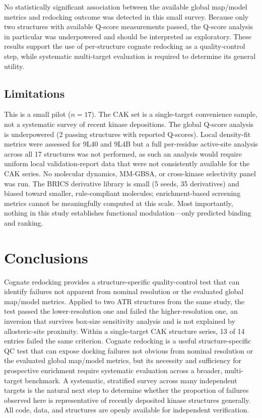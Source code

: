 \documentclass[global,twocolumn]{svjour}
\begin{document}
No statistically significant association between the available global
map/model metrics and redocking outcome was detected in this small survey.
Because only two structures with available Q-score measurements passed, the
Q-score analysis in particular was underpowered and should be interpreted as
exploratory. These results support the use of per-structure cognate redocking
as a quality-control step, while systematic multi-target evaluation is
required to determine its general utility.

\subsection{Limitations}

This is a small pilot ($n=17$). The CAK set is a single-target convenience
sample, not a systematic survey of recent kinase depositions. The global
Q-score analysis is underpowered (2 passing structures with reported
Q-scores). Local density-fit metrics were assessed for 9L40 and 9L4B but a
full per-residue active-site analysis across all 17 structures was not
performed, as such an analysis would require uniform local validation-report
data that were not consistently available for the CAK series. No molecular
dynamics, MM-GBSA, or cross-kinase selectivity panel was run. The BRICS
derivative library is small (5 seeds, 35 derivatives) and biased toward
smaller, rule-compliant molecules; enrichment-based screening metrics cannot
be meaningfully computed at this scale. Most importantly, nothing in this
study establishes functional modulation---only predicted binding and ranking.

\section{Conclusions}

Cognate redocking provides a structure-specific quality-control test that can
identify failures not apparent from nominal resolution or the evaluated
global map/model metrics. Applied to two ATR structures from the same study,
the test passed the lower-resolution one and failed the higher-resolution
one, an inversion that survives box-size sensitivity analysis and is not
explained by allosteric-site proximity. Within a single-target CAK structure
series, 13 of 14 entries failed the same criterion. Cognate redocking is a
useful structure-specific QC test that can expose docking failures not
obvious from nominal resolution or the evaluated global map/model metrics,
but its necessity and sufficiency for prospective enrichment require
systematic evaluation across a broader, multi-target benchmark. A systematic,
stratified survey across many independent targets is the natural next step
to determine whether the proportion of failures observed here is
representative of recently deposited kinase structures generally. All code,
data, and structures are openly available for independent verification.
\end{document}

